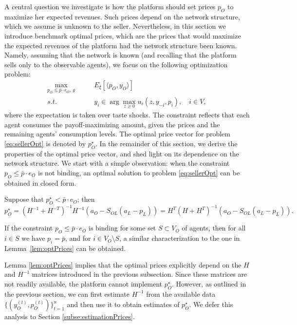 \documentclass[opre,nonblindrev]{informs3} %
\begin{document}
A central question we investigate  is how the platform should set prices ${p}_O$ to maximize her expected revenues.
Such prices depend on the network structure, which we assume is  unknown to the seller.
Nevertheless, in this section we introduce benchmark optimal prices, which are the prices that would maximize the expected revenues of the platform had the network structure been known.
Namely,
assuming that the network is known (and recalling that the platform  sells only to the observable agents), we focus on the following optimization problem:
\begin{equation}\label{eq:sellerOpt}
\begin{aligned}
\max_{ {p}_O \leq \bar{p} \cdot {e}_O,~ {y}} \qquad & {E}_{\xi}[\langle {p}_O, {y}_O \rangle] \\ %
s.t. \qquad & y_i\in \arg\max_{z\geq 0} u_i(z,y_{-i}, p_i),  \quad  i\in V,
\end{aligned}
\end{equation}
where the expectation is taken over taste shocks.
The constraint reflects that each agent consumes the payoff-maximizing amount, given the prices and the remaining agents' consumption levels.  The optimal price vector for problem \eqref{eq:sellerOpt} is denoted by ${p}_O^\star$.
In the remainder of this section, we derive the properties of the optimal price vector, and shed light on its dependence on the  network structure.
We start with a simple observation: when
the constraint ${p}_O\leq \bar p \cdot {e}_O$ is not binding, an optimal solution to  problem \eqref{eq:sellerOpt} can be obtained in closed form.
\begin{lemma} \label{lem:optPrices}
	Suppose  that ${p}_O^\star < \bar p \cdot {e}_O$; then
	\begin{equation*}{p}_O^\star = (H^{-1}+H^{-T})^{-1}
	H^{-1} ({a}_O-S_{OL}({a}_L-{p}_L) )=
	H^{T}(H+H^{T})^{-1}
({a}_O-S_{OL}({a}_L-{p}_L)) .
	\end{equation*}
	\end{lemma}
   If the constraint
   $p_O\leq \bar p \cdot  {e}_O$
   is binding
for   some set $S\subset V_O$ of agents, then
for all   $i\in S$   we have  $p_i=\bar p$, and for $i\in V_O \setminus S$, a similar characterization to the one in Lemma~\ref{lem:optPrices}   can be obtained.


Lemma \ref{lem:optPrices} implies that the optimal prices explicitly depend on the $H$ and $H^{-1}$ matrices introduced in the previous subsection.
Since these matrices are not readily available,
the platform cannot implement ${p}_O^\star$.
However, as outlined in the previous section, we can first estimate 
$H^{-1}$
from the available data $\{({y}_O^{(t)},{p}_O^{(t)})\}_{t=1}^n$ and then use it to obtain estimates of ${p}_O^\star$.
We defer  
this analysis to Section \ref{subse:estimationPrices}.
\end{document}
